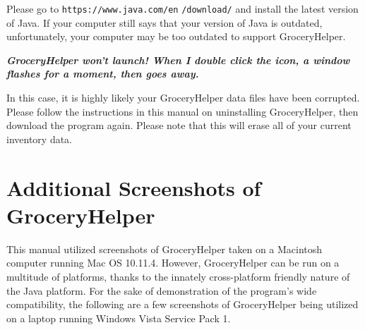 \documentclass[letterpaper,12pt]{article}
\renewenvironment{itemize}[1]{\begin{compactitem}#1}{\end{compactitem}}
\begin{document}
\begin{itemize}
\item[A.] Please go to \verb|https://www.java.com/en| \verb|/download/| and install the latest version of Java. If your computer still says that your version of Java is outdated, unfortunately, your computer may be too outdated to support GroceryHelper. \\

\item [Q.] \textit{\textbf{GroceryHelper won't launch! When I double click the icon, a window flashes for a moment, then goes away.}}\\

\item[A.] In this case, it is highly likely your GroceryHelper data files have been corrupted. Please follow the instructions in this manual on uninstalling GroceryHelper, then download the program again. Please note that this will erase all of your current inventory data.

\end{itemize}


\section{Additional Screenshots of GroceryHelper}

This manual utilized screenshots of GroceryHelper taken on a Macintosh computer running Mac OS 10.11.4. However, GroceryHelper can be run on a multitude of platforms, thanks to the innately cross-platform friendly nature of the Java platform. For the sake of demonstration of the program's wide compatibility, the following are a few screenshots of GroceryHelper being utilized on a laptop running Windows Vista Service Pack 1.
\end{document}
